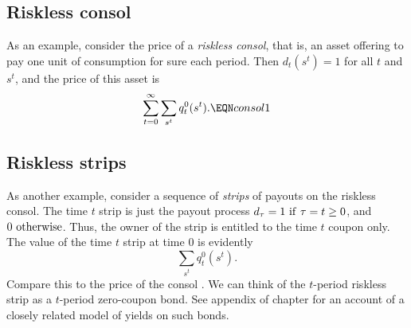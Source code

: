 \subsection{Riskless consol}
  As an example, consider the price of a {\it riskless consol}, that is,
an asset offering to pay one unit of consumption for sure
each period.  Then  $d_t(s^t) = 1$ for all $t$ and $s^t$, and the price
of this asset is
$$ \sum_{t=0}^\infty  \sum_{s^t} q_t^0(s^t) . \EQN consol1 $$


\subsection{Riskless strips}
  As another example, consider a  sequence of  {\it strips} of %
payouts on the riskless consol.  The time $t$ strip is just the payout
process $d_\tau = 1 \ {\rm if} \ \tau=t \geq 0$,
 and $0 \ {\rm otherwise}$.  Thus,
the owner of the strip is entitled  to the time $t$ coupon only.
The value of the time $t$ strip at time $0$ is evidently
$$ \sum_{s^t} q_t^0(s^t) .$$
Compare this to the price of the consol .  We can think of the $t$-period riskless strip as a
$t$-period zero-coupon bond. See appendix   of chapter  for an
account of a  closely related model of yields on such bonds.



